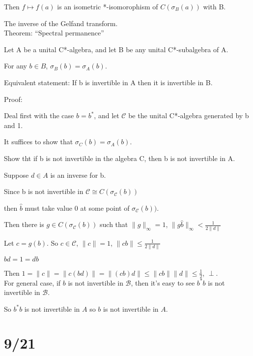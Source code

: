 \documentclass[12pt]{article}
\newcommand{\conj}{^*}
\begin{document}
Then $f \mapsto f(a)$ is an isometric *-isomorophism of $C(\sigma_B(a))$ with B.

The inverse of the Gelfand transform.\\

\noindent
Theorem: ``Spectral permanence''

Let A be a unital C*-algebra, and let B be any unital C*-subalgebra of A.

For any $b \in B$, $\sigma_B(b) = \sigma_A(b)$.

Equivalent statement: If b is invertible in A then it is invertible in B.

\noindent
Proof:

Deal first with the case $b = b\conj$, and let $\mathcal{C}$ be the unital C*-algebra generated by b and 1.

It suffices to show that $\sigma_C(b) = \sigma_A(b)$.

Show tht if b is not invertible in the algebra C, then b is not invertible in A.

Suppose $d \in A$ is an inverse for b.

Since b is not invertible in $\mathcal{C} \cong C(\sigma_\mathcal{C}(b))$

then $\hat{b}$ must take value 0 at some point of $\sigma_{\mathcal{C}}(b))$.

Then there is $g \in C(\sigma_{\mathcal{C}}(b))$ such that $\|g\|_\infty = 1$, $\|g\hat{b}\|_\infty < \frac{1}{2\|d\|}$

Let $c = g(b)$.  So $c \in \mathcal{C}$, $\|c\| = 1$, $\|cb\| \leq \frac{1}{2\|d\|}$

$bd = 1 = db$

Then $1 = \|c\| = \|c(bd)\| = \|(cb)d\| \leq \|cb\|\|d\| \leq \frac{1}{2}$,  $\perp$.\\

\noindent
For general case, if $b$ is not invertible in $\mathcal{B}$, then it's easy to see $b\conj b$ is not invertible in $\mathcal{B}$.

So $b\conj b$ is not invertible in $A$ so $b$ is not invertible in $A$.

\section{9/21}
\end{document}
